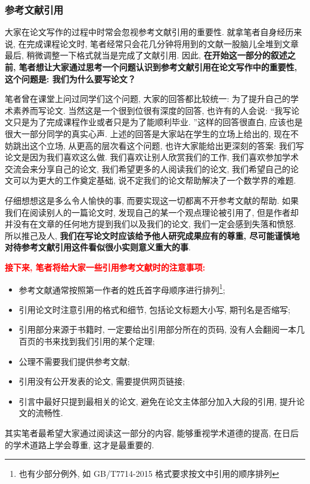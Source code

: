 \documentclass{formatBook}
\newcommand{\XG}[1]{\textcolor{red}{#1}}
\begin{document}
\subsubsection{参考文献引用}
大家在论文写作的过程中时常会忽视参考文献引用的重要性. 就拿笔者自身经历来说, 在完成课程论文时, 笔者经常只会花几分钟将用到的文献一股脑儿全堆到文章最后, 稍微调整一下格式就当是完成了文献引用. 因此, \textbf{在开始这一部分的叙述之前, 笔者想让大家通过思考一个问题认识到参考文献引用在论文写作中的重要性, 这个问题是: 我们为什么要写论文？}\par
笔者曾在课堂上问过同学们这个问题, 大家的回答都比较统一: 为了提升自己的学术素养而写论文. 当然这是一个很到位很有深度的回答, 也许有的人会说: {``}我写论文只是为了完成课程作业或者只是为了能顺利毕业. ''这样的回答很直白, 应该也是很大一部分同学的真实心声. 上述的回答是大家站在学生的立场上给出的, 现在不妨跳出这个立场, 从更高的层次看这个问题, 也许大家能给出更深刻的答案: 我们写论文是因为我们喜欢这么做. 我们喜欢让别人欣赏我们的工作, 我们喜欢参加学术交流会来分享自己的论文, 我们希望更多的人阅读我们的论文, 我们希望自己的论文可以为更大的工作奠定基础, 说不定我们的论文帮助解决了一个数学界的难题. \par
仔细想想这是多么令人愉快的事, 而要实现这一切都离不开参考文献的帮助. 如果我们在阅读别人的一篇论文时, 发现自己的某一个观点理论被引用了, 但是作者却并没有在文章的任何地方提到我们以及我们的论文, 我们一定会感到失落和愤怒. 所以推己及人, \textbf{我们在写论文时应该给予他人研究成果应有的尊重, 尽可能谨慎地对待参考文献引用这件看似很小实则意义重大的事}. \par
\XG{\textbf{接下来, 笔者将给大家一些引用参考文献时的注意事项:}}
\begin{itemize}
    \item {参考文献通常按照第一作者的姓氏首字母顺序进行排列\footnote{也有少部分例外, 如 GB/T7714-2015 格式要求按文中引用的顺序排列}}{;}
    \item 引用论文时注意引用的格式和细节, 包括论文标题大小写, 期刊名是否缩写{;}
    \item 引用部分来源于书籍时, 一定要给出引用部分所在的页码, 没有人会翻阅一本几百页的书来找到我们引用的某个定理{;}
    \item 公理不需要我们提供参考文献{;}
    \item 引用没有公开发表的论文, 需要提供网页链接{;}
    \item 引言中最好只提到最相关的论文, 避免在论文主体部分加入大段的引用, 提升论文的流畅性{.}
\end{itemize}
\par
其实笔者最希望大家通过阅读这一部分的内容, 能够重视学术道德的提高, 在日后的学术道路上学会尊重, 这才是最重要的.
\end{document}
